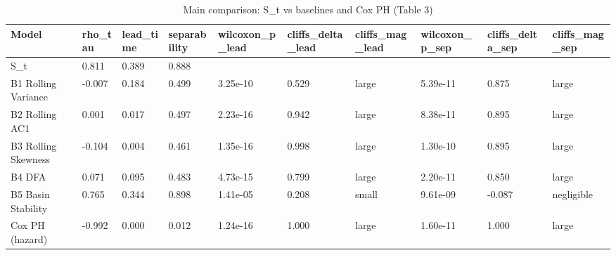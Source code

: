 \begin{table}
\caption{Main comparison: S_t vs baselines and Cox PH (Table 3)}
\label{tab:table3_main_comparison}
\begin{tabular}{llllllllll}
\toprule
Model & rho\_tau & lead\_time & separability & wilcoxon\_p\_lead & cliffs\_delta\_lead & cliffs\_mag\_lead & wilcoxon\_p\_sep & cliffs\_delta\_sep & cliffs\_mag\_sep \\
\midrule
S\_t & 0.811 & 0.389 & 0.888 &  &  &  &  &  &  \\
B1 Rolling Variance & -0.007 & 0.184 & 0.499 & 3.25e-10 & 0.529 & large & 5.39e-11 & 0.875 & large \\
B2 Rolling AC1 & 0.001 & 0.017 & 0.497 & 2.23e-16 & 0.942 & large & 8.38e-11 & 0.895 & large \\
B3 Rolling Skewness & -0.104 & 0.004 & 0.461 & 1.35e-16 & 0.998 & large & 1.30e-10 & 0.895 & large \\
B4 DFA & 0.071 & 0.095 & 0.483 & 4.73e-15 & 0.799 & large & 2.20e-11 & 0.850 & large \\
B5 Basin Stability & 0.765 & 0.344 & 0.898 & 1.41e-05 & 0.208 & small & 9.61e-09 & -0.087 & negligible \\
Cox PH (hazard) & -0.992 & 0.000 & 0.012 & 1.24e-16 & 1.000 & large & 1.60e-11 & 1.000 & large \\
\bottomrule
\end{tabular}
\end{table}
